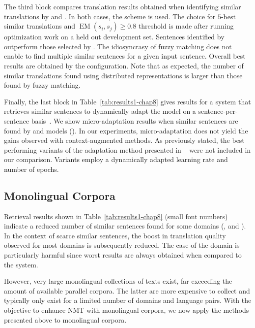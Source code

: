 The third block compares translation results obtained when identifying similar translations by  and . In both cases, the  scheme is used.
The choice for $5$-best similar translations and $\operatorname{EM}(s_i,s_j) \geq 0.8$ threshold is made after running optimization work on a held out development set.
Sentences identified by   outperform those selected by .
The idiosyncrasy of fuzzy matching does not enable to find multiple similar sentences for a given input sentence.
Overall best results are obtained by the  configuration.
Note that as expected, the number of similar translations found using distributed representations is larger than those found by fuzzy matching.

Finally, the last block in Table~\ref{tab:results1-chap8} gives results for a system that retrieves similar sentences to dynamically adapt the model on a sentence-per-sentence basis~\citep{Farajian17multidomain,Li18onesentence}. We show micro-adaptation results when similar sentences are found by  and  models ().
In our experiments, micro-adaptation does not yield the gains observed with context-augmented methods. As previously stated, the best performing variants of the adaptation method presented in ~\citet{Farajian17multidomain} were not included in our comparison. Variants employ a dynamically adapted learning rate and number of epochs. 

\subsection*{Monolingual Corpora}

Retrieval results shown in Table~\ref{tab:results1-chap8} (small font numbers) indicate a reduced number of similar sentences found for some domains (,  and ). 
In the context of scarce similar sentences, the boost in translation quality observed for most domains is subsequently reduced. The case of the  domain is particularly harmful since worst results are always obtained when compared to the  system.

However, very large monolingual collections of texts exist, far exceeding the amount of available parallel corpora. The latter are more expensive to collect and typically only exist for a limited number of domains and language pairs. With the objective to enhance NMT with monolingual corpora, we now apply the methods presented above to monolingual corpora. 

